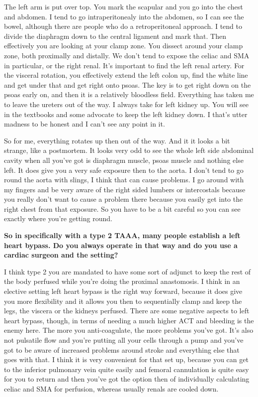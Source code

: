 \documentclass[
]{book}
\begin{document}
The left arm is put over top. You mark the scapular and you go into the
chest and abdomen. I tend to go intraperitonealy into the abdomen, so I
can see the bowel, although there are people who do a retroperitoneal
approach. I tend to divide the diaphragm down to the central ligament
and mark that. Then effectively you are looking at your clamp zone. You
dissect around your clamp zone, both proximally and distally. We don't
tend to expose the celiac and SMA in particular, or the right renal.
It's important to find the left renal artery. For the visceral rotation,
you effectively extend the left colon up, find the white line and get
under that and get right onto psoas. The key is to get right down on the
psoas early on, and then it is a relatively bloodless field. Everything
has taken me to leave the ureters out of the way. I always take for left
kidney up. You will see in the textbooks and some advocate to keep the
left kidney down. I that's utter madness to be honest and I can't see
any point in it.

So for me, everything rotates up then out of the way. And it it looks a
bit strange, like a postmortem. It looks very odd to see the whole left
side abdominal cavity when all you've got is diaphragm muscle, psoas
muscle and nothing else left. It does give you a very safe exposure then
to the aorta. I don't tend to go round the aorta with slings, I think
that can cause problems. I go around with my fingers and be very aware
of the right sided lumbers or intercostals because you really don't want
to cause a problem there because you easily get into the right chest
from that exposure. So you have to be a bit careful so you can see
exactly where you're getting round.

\textbf{So in specifically with a type 2 TAAA, many people establish a left
heart bypass. Do you always operate in that way and do you use a cardiac
surgeon and the setting?}

I think type 2 you are mandated to have some sort of adjunct to keep the
rest of the body perfused while you're doing the proximal anastomosis. I
think in an elective setting left heart bypass is the right way forward,
because it does give you more flexibility and it allows you then to
sequentially clamp and keep the legs, the viscera or the kidneys
perfused. There are some negative aspects to left heart bypass, though,
in terms of needing a much higher ACT and bleeding is the enemy here.
The more you anti-coagulate, the more problems you've got. It's also not
pulsatile flow and you're putting all your cells through a pump and
you've got to be aware of increased problems around stroke and
everything else that goes with that. I think it is very convenient for
that set up, because you can get to the inferior pulmonary vein quite
easily and femoral cannulation is quite easy for you to return and then
you've got the option then of individually calculating celiac and SMA
for perfusion, whereas usually renals are cooled down.
\end{document}

